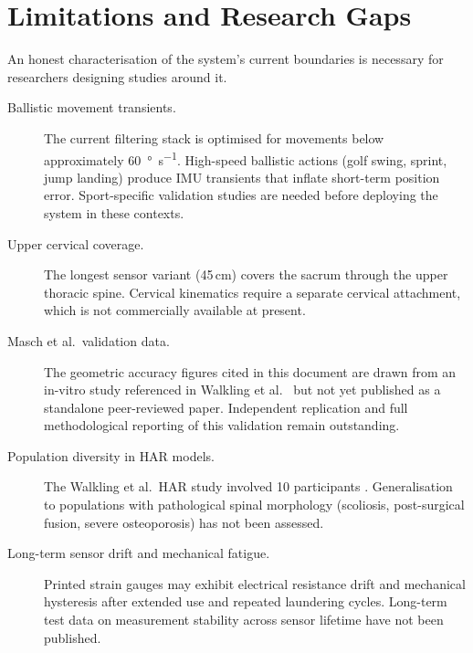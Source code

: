 \section{Limitations and Research Gaps}

An honest characterisation of the system's current boundaries is necessary for
researchers designing studies around it.

\begin{description}
	\item[Ballistic movement transients.]
	      The current filtering stack is optimised for movements below approximately
	      \SI{60}{\degree\per\second}.
	      High-speed ballistic actions (golf swing, sprint, jump landing) produce \acs{IMU}
	      transients that inflate short-term position error.
	      Sport-specific validation studies are needed before deploying the system in
	      these contexts.

	\item[Upper cervical coverage.]
	      The longest sensor variant (45\,cm) covers the sacrum through the upper thoracic
	      spine.
	      Cervical kinematics require a separate cervical attachment, which is not
	      commercially available at present.

	\item[Masch et al.\ validation data.]
	      The geometric accuracy figures cited in this document are drawn from an
	      in-vitro study referenced in Walkling et al.\ \cite{walkling2025} but not yet
	      published as a standalone peer-reviewed paper.
	      Independent replication and full methodological reporting of this validation remain
	      outstanding.

	\item[Population diversity in \ac{HAR} models.]
	      The Walkling et al.\ HAR study involved 10 participants \cite{walkling2025}.
	      Generalisation to populations with pathological spinal morphology (scoliosis,
	      post-surgical fusion, severe osteoporosis) has not been assessed.

	\item[Long-term sensor drift and mechanical fatigue.]
	      Printed strain gauges may exhibit electrical resistance drift and mechanical
	      hysteresis after extended use and repeated laundering cycles.
	      Long-term test data on measurement stability across sensor lifetime have not been
	      published.
\end{description}
